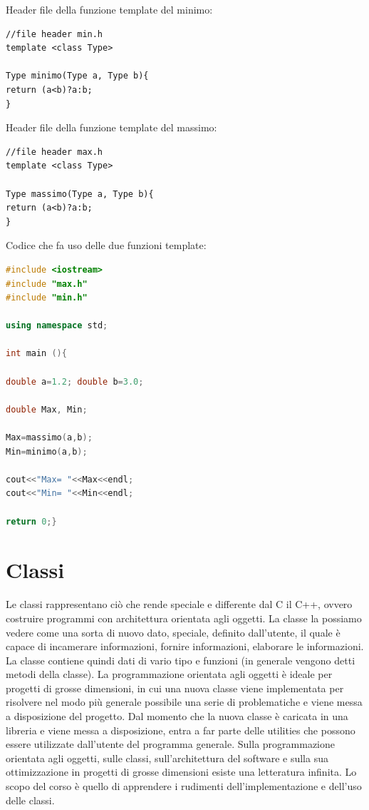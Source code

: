 \documentclass[11pt,fleqn]{book} %
\begin{document}
Header file della funzione template del minimo:
\begin{verbatim}
//file header min.h
template <class Type>

Type minimo(Type a, Type b){
return (a<b)?a:b;
}
\end{verbatim}
Header file della funzione template del massimo:
\begin{verbatim}
//file header max.h
template <class Type>

Type massimo(Type a, Type b){
return (a<b)?a:b;
}
\end{verbatim}

Codice che fa uso delle due funzioni template:




\begin{lstlisting}[language=c++]
#include <iostream>
#include "max.h"
#include "min.h"

using namespace std;

int main (){

double a=1.2; double b=3.0;

double Max, Min;

Max=massimo(a,b);
Min=minimo(a,b);

cout<<"Max= "<<Max<<endl;
cout<<"Min= "<<Min<<endl;

return 0;}

\end{lstlisting}





\chapter{Classi}

Le classi rappresentano ciò che rende speciale e differente dal C il C++, ovvero costruire programmi con architettura orientata agli oggetti.
La classe la possiamo vedere come una sorta di nuovo dato, speciale, definito dall'utente, il quale è capace di incamerare informazioni, fornire informazioni, elaborare le informazioni. La classe contiene quindi dati di vario tipo e funzioni (in generale vengono detti metodi della classe).
La programmazione orientata agli oggetti è ideale per progetti di grosse dimensioni, in cui una nuova classe viene implementata per risolvere nel modo più generale possibile una serie di problematiche e viene messa a disposizione del progetto. Dal momento che la nuova classe è caricata in una libreria e viene messa a disposizione, entra a far parte delle utilities che possono essere utilizzate dall'utente del programma generale.
Sulla programmazione orientata agli oggetti, sulle classi, sull'architettura del software e sulla sua ottimizzazione in progetti di grosse dimensioni esiste una letteratura infinita. Lo scopo del corso è quello di apprendere i rudimenti dell'implementazione e dell'uso delle classi.
\end{document}
